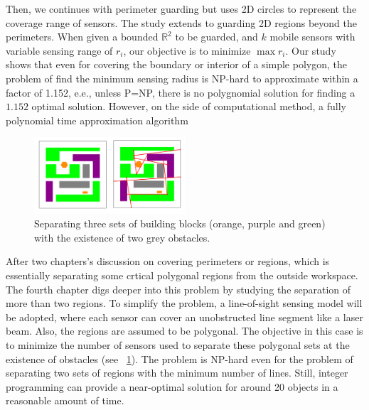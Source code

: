 Then, we continues with perimeter guarding but uses 2D circles to represent the 
coverage range of sensors. The study extends to guarding 2D regions beyond the perimeters. 
When given a bounded $\mathbb R^2$ to be guarded, and $k$ mobile sensors with variable sensing range of $r_i$, 
our objective is to minimize $\max r_i$.
Our study shows that even for covering the boundary or interior of a simple polygon, 
the problem of find the minimum sensing radius is NP-hard to approximate within a factor of 1.152, e.e.,
unless P=NP, there is no polygnomial solution for finding a $1.152$ optimal solution. 
However, on the side of computational method, a fully polynomial time approximation algorithm 


\begin{figure}[h]
    \centering
    \includegraphics[width = 0.5\textwidth]{chapters/bf/fig/intro_pic.png}
    \caption[Separating three sets of building blocks with the existence of two obstacles]{Separating three sets of building blocks (orange, purple and green) with the existence of two grey obstacles.}
    \label{fig:intro-lines}
\end{figure}


After two chapters's discussion on covering perimeters or regions, which is essentially separating 
some crtical polygonal regions from the outside workspace. 
The fourth chapter digs deeper into this problem by studying the separation of more than two regions. 
To simplify the problem, a line-of-sight sensing model will be adopted, where each sensor can cover
an unobstructed line segment like a laser beam. Also, the regions are assumed to be polygonal.
The objective in this case is to minimize the number of sensors used to separate these polygonal sets 
at the existence of obstacles (see ~\ref{fig:intro-lines}).
The problem is NP-hard even for the problem of separating two sets of regions with the minimum number of lines. 
Still, integer programming can provide a near-optimal solution for around 20 objects in a reasonable amount of time. 

